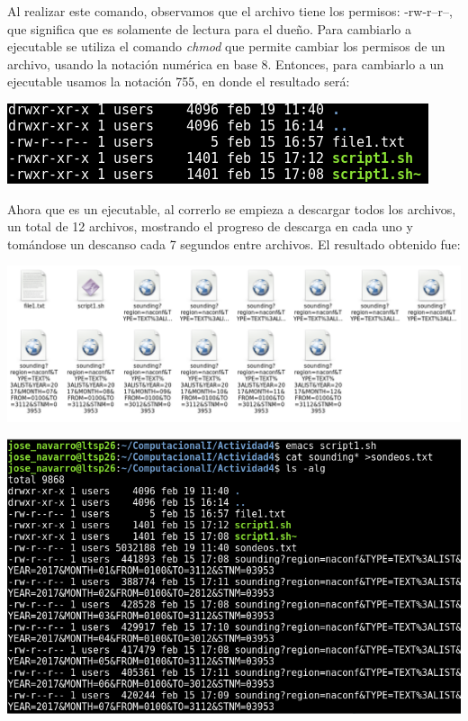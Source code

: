 \documentclass[12pt]{article}
\begin{document}
Al realizar este comando, observamos que el archivo tiene los permisos:  -rw-r--r--, que significa que es solamente de lectura para el dueño. Para cambiarlo a ejecutable se utiliza  el comando  \textit{chmod} que permite cambiar los permisos de un archivo, usando la notación numérica en base 8. Entonces, para cambiarlo a un ejecutable usamos la notación 755, en donde el resultado será:

\begin{center}
\includegraphics[scale=0.7]{ejecutable.png}
\end{center} 

Ahora que es un ejecutable, al correrlo se empieza a descargar todos los archivos, un total de 12 archivos, mostrando el progreso de descarga en cada uno y tomándose un descanso cada 7 segundos entre archivos. El resultado obtenido fue:

\begin{center}
\includegraphics[scale=0.45]{Archivos.png}
\end{center} 

\begin{center}
\includegraphics[scale=0.55]{ls_-alg.png}
\end{center} 
\end{document}
